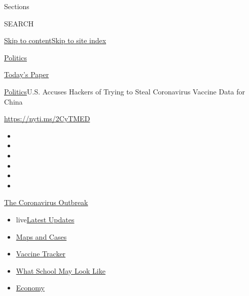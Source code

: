Sections

SEARCH

\protect\hyperlink{site-content}{Skip to
content}\protect\hyperlink{site-index}{Skip to site index}

\href{https://www.nytimes.com/section/politics}{Politics}

\href{https://myaccount.nytimes.com/auth/login?response_type=cookie\&client_id=vi}{}

\href{https://www.nytimes.com/section/todayspaper}{Today's Paper}

\href{/section/politics}{Politics}\textbar{}U.S. Accuses Hackers of
Trying to Steal Coronavirus Vaccine Data for China

\url{https://nyti.ms/2CyTMED}

\begin{itemize}
\item
\item
\item
\item
\item
\item
\end{itemize}

\href{https://www.nytimes.com/news-event/coronavirus?action=click\&pgtype=Article\&state=default\&region=TOP_BANNER\&context=storylines_menu}{The
Coronavirus Outbreak}

\begin{itemize}
\tightlist
\item
  live\href{https://www.nytimes.com/2020/08/01/world/coronavirus-covid-19.html?action=click\&pgtype=Article\&state=default\&region=TOP_BANNER\&context=storylines_menu}{Latest
  Updates}
\item
  \href{https://www.nytimes.com/interactive/2020/us/coronavirus-us-cases.html?action=click\&pgtype=Article\&state=default\&region=TOP_BANNER\&context=storylines_menu}{Maps
  and Cases}
\item
  \href{https://www.nytimes.com/interactive/2020/science/coronavirus-vaccine-tracker.html?action=click\&pgtype=Article\&state=default\&region=TOP_BANNER\&context=storylines_menu}{Vaccine
  Tracker}
\item
  \href{https://www.nytimes.com/interactive/2020/07/29/us/schools-reopening-coronavirus.html?action=click\&pgtype=Article\&state=default\&region=TOP_BANNER\&context=storylines_menu}{What
  School May Look Like}
\item
  \href{https://www.nytimes.com/live/2020/07/31/business/stock-market-today-coronavirus?action=click\&pgtype=Article\&state=default\&region=TOP_BANNER\&context=storylines_menu}{Economy}
\end{itemize}

